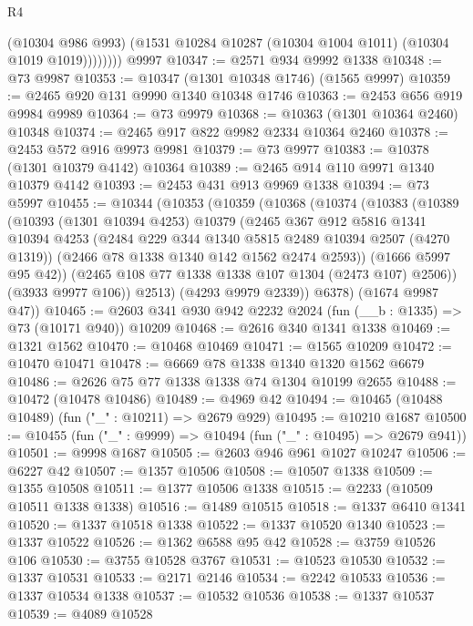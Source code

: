 \begin{lexlean}{R4}
\begin{coremodule}
                (@10304 @986 @993)
                (@1531 @10284 @10287 (@10304 @1004 @1011) (@10304 @1019 @1019))))))))
    @9997
@10347 := @2571 @934 @9992 @1338
@10348 := @73 @9987
@10353 := @10347 (@1301 @10348 @1746) (@1565 @9997)
@10359 := @2465 @920 @131 @9990 @1340 @10348 @1746
@10363 := @2453 @656 @919 @9984 @9989
@10364 := @73 @9979
@10368 := @10363 (@1301 @10364 @2460) @10348
@10374 := @2465 @917 @822 @9982 @2334 @10364 @2460
@10378 := @2453 @572 @916 @9973 @9981
@10379 := @73 @9977
@10383 := @10378 (@1301 @10379 @4142) @10364
@10389 := @2465 @914 @110 @9971 @1340 @10379 @4142
@10393 := @2453 @431 @913 @9969 @1338
@10394 := @73 @5997
@10455 := @10344
    (@10353
      (@10359
        (@10368
          (@10374
            (@10383
              (@10389
                (@10393
                  (@1301 @10394 @4253)
                  @10379
                  (@2465
                    @367
                    @912
                    @5816
                    @1341
                    @10394
                    @4253
                    (@2484 @229 @344 @1340 @5815 @2489 @10394 @2507 (@4270 @1319))
                    (@2466 @78 @1338 @1340 @142 @1562 @2474 @2593))
                  (@1666 @5997 @95 @42))
                (@2465 @108 @77 @1338 @1338 @107 @1304 (@2473 @107) @2506))
              (@3933 @9977 @106))
            @2513)
          (@4293 @9979 @2339))
        @6378)
      (@1674 @9987 @47))
@10465 := @2603 @341 @930 @942 @2232 @2024 (fun (__b : @1335) => @73 (@10171 @940)) @10209
@10468 := @2616 @340 @1341 @1338
@10469 := @1321 @1562
@10470 := @10468 @10469
@10471 := @1565 @10209
@10472 := @10470 @10471
@10478 := @6669 @78 @1338 @1340 @1320 @1562 @6679
@10486 := @2626 @75 @77 @1338 @1338 @74 @1304 @10199 @2655
@10488 := @10472 (@10478 @10486)
@10489 := @4969 @42
@10494 := @10465 (@10488 @10489) (fun ("_" : @10211) => @2679 @929)
@10495 := @10210 @1687
@10500 := @10455 (fun ("_" : @9999) => @10494 (fun ("_" : @10495) => @2679 @941))
@10501 := @9998 @1687
@10505 := @2603 @946 @961 @1027 @10247
@10506 := @6227 @42
@10507 := @1357 @10506
@10508 := @10507 @1338
@10509 := @1355 @10508
@10511 := @1377 @10506 @1338
@10515 := @2233 (@10509 @10511 @1338 @1338)
@10516 := @1489 @10515
@10518 := @1337 @6410 @1341
@10520 := @1337 @10518 @1338
@10522 := @1337 @10520 @1340
@10523 := @1337 @10522
@10526 := @1362 @6588 @95 @42
@10528 := @3759 @10526 @106
@10530 := @3755 @10528 @3767
@10531 := @10523 @10530
@10532 := @1337 @10531
@10533 := @2171 @2146
@10534 := @2242 @10533
@10536 := @1337 @10534 @1338
@10537 := @10532 @10536
@10538 := @1337 @10537
@10539 := @4089 @10528

\end{coremodule}
\end{lexlean}
